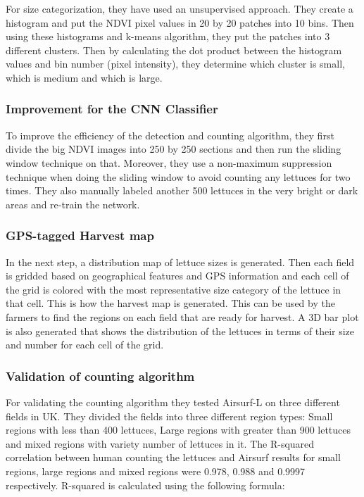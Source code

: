 \documentclass{article}
\begin{document}
For size categorization, they have used an unsupervised approach. They create a histogram and put the NDVI pixel values in 20 by 20 patches into 10 bins. Then using these histograms and k-means algorithm, they put the patches into 3 different clusters. Then by calculating the dot product between the histogram values and bin number (pixel intensity), they determine which cluster is small, which is medium and which is large. 

\subsubsection{Improvement for the CNN Classifier}

To improve the efficiency of the detection and counting algorithm, they first divide the big NDVI images into 250 by 250 sections and then run the sliding window technique on that. Moreover, they use a non-maximum suppression technique when doing the sliding window to avoid counting any lettuces for two times. They also manually labeled another 500 lettuces in the very bright or dark areas and re-train the network. 

\subsubsection{GPS-tagged Harvest map}

In the next step, a distribution map of lettuce sizes is generated. Then each field is gridded based on geographical features and GPS information and each cell of the grid is colored with the most representative size category of the lettuce in that cell. This is how the harvest map is generated. This can be used by the farmers to find the regions on each field that are ready for harvest. A 3D bar plot is also generated that shows the distribution of the lettuces in terms of their size and number for each cell of the grid. 

\subsubsection{Validation of counting algorithm}

For validating the counting algorithm they tested Airsurf-L on three different fields in UK. They divided the fields into three different region types: Small regions with less than 400 lettuces, Large regions with greater than 900 lettuces and mixed regions with variety number of lettuces in it. The R-squared correlation between human counting the lettuces and Airsurf results for small regions, large regions and mixed regions were 0.978, 0.988 and 0.9997 respectively. R-squared is calculated using the following formula:
\end{document}

